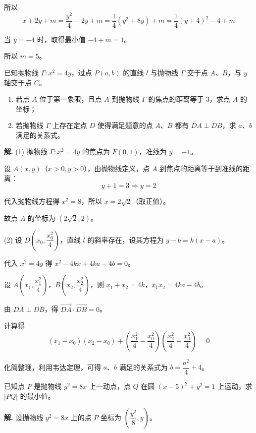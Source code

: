 \documentclass[11pt]{ctexrep}
\begin{document}
所以
\[
    x + 2y + m = \frac{y^2}{4} + 2y + m = \frac{1}{4}(y^2 + 8y) + m = \frac{1}{4}(y + 4)^2 - 4 + m
\]

当 $y = -4$ 时，取得最小值 $-4 + m = 1$。

所以 $m = 5$。

\begin{realexam}[2025届上海二模]
    已知抛物线 $\Gamma: x^2 = 4y$，过点 $P(a, b)$ 的直线 $l$ 与抛物线 $\Gamma$ 交于点 $A$、$B$，与 $y$ 轴交于点 $C$。
    \begin{enumerate}
        \item 若点 $A$ 位于第一象限，且点 $A$ 到抛物线 $\Gamma$ 的焦点的距离等于 $3$，求点 $A$ 的坐标；
        \item 若抛物线 $\Gamma$ 上存在定点 $D$ 使得满足题意的点 $A$、$B$ 都有 $DA \perp DB$，求 $a$、$b$ 满足的关系式。
    \end{enumerate}
\end{realexam}

\textbf{解.} (1) 抛物线 $\Gamma: x^2 = 4y$ 的焦点为 $F(0, 1)$，准线为 $y = -1$。

设 $A(x, y)$（$x > 0, y > 0$），由抛物线定义，点 $A$ 到焦点的距离等于到准线的距离：
\[
    y + 1 = 3 \Rightarrow y = 2
\]

代入抛物线方程得 $x^2 = 8$，所以 $x = 2\sqrt{2}$（取正值）。

故点 $A$ 的坐标为 $(2\sqrt{2}, 2)$。

(2) 设 $D\left(x_0, \dfrac{x_0^2}{4}\right)$，直线 $l$ 的斜率存在，设其方程为 $y - b = k(x - a)$。

代入 $x^2 = 4y$ 得 $x^2 - 4kx + 4ka - 4b = 0$。

设 $A\left(x_1, \dfrac{x_1^2}{4}\right)$，$B\left(x_2, \dfrac{x_2^2}{4}\right)$，则 $x_1 + x_2 = 4k$，$x_1x_2 = 4ka - 4b$。

由 $DA \perp DB$，得 $\overrightarrow{DA} \cdot \overrightarrow{DB} = 0$。

计算得
\[
    (x_1 - x_0)(x_2 - x_0) + \left(\frac{x_1^2}{4} - \frac{x_0^2}{4}\right)\left(\frac{x_2^2}{4} - \frac{x_0^2}{4}\right) = 0
\]

化简整理，利用韦达定理，可得 $a$、$b$ 满足的关系式为 $b = \dfrac{a^2}{4} + 4$。

\begin{example}[抛物线与圆的综合]
    已知点 $P$ 是抛物线 $y^2 = 8x$ 上一动点，点 $Q$ 在圆 $(x - 5)^2 + y^2 = 1$ 上运动，求 $|PQ|$ 的最小值。
\end{example}

\textbf{解.} 设抛物线 $y^2 = 8x$ 上的点 $P$ 坐标为 $\left(\dfrac{y^2}{8}, y\right)$。
\end{document}
